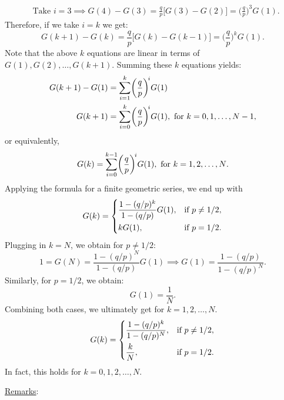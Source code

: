 \begin{Example}
\begin{align*}
             & \text{Take $i=3$}\implies G(4)-G(3)=\frac{q}{p} \bigl[G(3)-G(2)\bigr]=\biggl(\frac{q}{p}\biggr)^{\!3}G(1).
      \end{align*}
      Therefore, if we take $ i=k $ we get:
      \[ G(k+1)-G(k)=\frac{q}{p} \bigl[G(k)-G(k-1)\bigr]=\biggl(\frac{q}{p}\biggr)^{\!k}G(1).\]
      Note that the above $ k $ equations are linear in terms of $ G(1),G(2),\ldots,G(k+1) $. Summing these $ k $ equations yields:
      \begin{align*}
            G(k+1)-G(1) & =\sum_{i=1}^{k} \biggl(\frac{q}{p} \biggr)^{\! i}G(1)                                   \\
            G(k+1)      & =\sum_{i=0}^{k} \biggl(\frac{q}{p} \biggr)^{\! i}G(1),\text{ for $ k=0,1,\ldots,N-1 $},
      \end{align*}
      or equivalently,
      \[ G(k)=\sum_{i=0}^{k-1}\biggl(\frac{q}{p} \biggr)^{\! i}G(1),\text{ for $ k=1,2,\ldots,N $}. \]
      Applying the formula for a finite geometric series, we end up with
      \[ G(k)=\begin{dcases}
                  \frac{1-(q/p)^k}{1-(q/p)}G(1), & \text{if $p\ne 1/2$}, \\
                  k G(1),                        & \text{if $p=1/2$}.    \\
            \end{dcases} \]
      Plugging in $ k=N $, we obtain for $ p\ne 1/2 $:
      \[ 1=G(N)=\frac{1-(q/p)^N}{1-(q/p)}G(1)\implies G(1)=\frac{1-(q/p)}{1-(q/p)^N}.  \]
      Similarly, for $ p=1/2 $, we obtain:
      \[ G(1)=\frac{1}{N}. \]
      Combining both cases, we ultimately get for $ k=1,2,\ldots,N $.
      \[ G(k)=\begin{dcases}
                  \frac{1-(q/p)^k}{1-(q/p)^N}, & \text{if $ p\ne 1/2 $}, \\
                  \frac{k}{N},                 & \text{if $p=1/2$}.
            \end{dcases} \]
      In fact, this holds for $ k=0,1,2,\ldots,N $.
\end{Example}
\noindent\underline{Remarks}:
